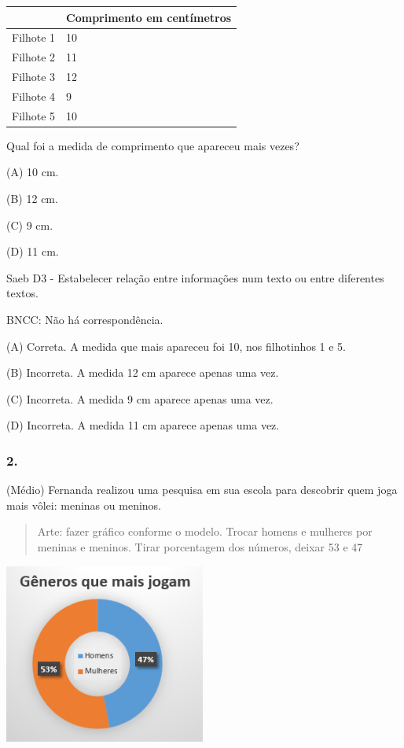 \begin{longtable}[]{@{}ll@{}}
\toprule
& \textbf{Comprimento em centímetros}\tabularnewline
\midrule
\endhead
Filhote 1 & 10\tabularnewline
Filhote 2 & 11\tabularnewline
Filhote 3 & 12\tabularnewline
Filhote 4 & 9\tabularnewline
Filhote 5 & 10\tabularnewline
\bottomrule
\end{longtable}

Qual foi a medida de comprimento que apareceu mais vezes?

(A) 10 cm.

(B) 12 cm.

(C) 9 cm.

(D) 11 cm.

Saeb D3 - Estabelecer relação entre informações num texto ou entre
diferentes textos.

BNCC: Não há correspondência.

(A) Correta. A medida que mais apareceu foi 10, nos filhotinhos 1 e 5.

(B) Incorreta. A medida 12 cm aparece apenas uma vez.

(C) Incorreta. A medida 9 cm aparece apenas uma vez.

(D) Incorreta. A medida 11 cm aparece apenas uma vez.

\subsubsection{2. }\label{section-69}

(Médio) Fernanda realizou uma pesquisa em sua escola para descobrir quem
joga mais vôlei: meninas ou meninos.

\begin{quote}
Arte: fazer gráfico conforme o modelo. Trocar homens e mulheres por
meninas e meninos. Tirar porcentagem dos números, deixar 53 e 47
\end{quote}

\includegraphics[width=2.60244in,height=2.32558in]{media/image31.png}

